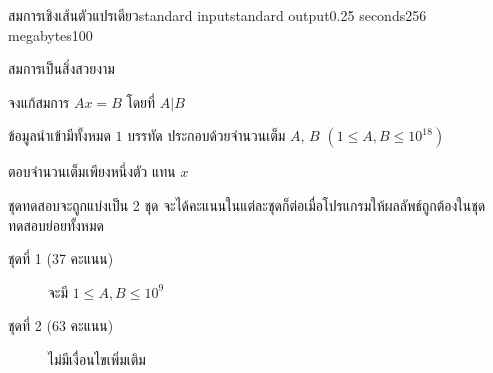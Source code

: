 \documentclass[11pt,a4paper]{article}
\begin{document}
\begin{problem}{สมการเชิงเส้นตัวแปรเดียว}{standard input}{standard output}{0.25 seconds}{256 megabytes}{100}

สมการเป็นสิ่งสวยงาม

จงแก้สมการ $Ax=B$ โดยที่ $A|B$

\InputFile
ข้อมูลนำเข้ามีทั้งหมด $1$ บรรทัด
ประกอบด้วยจำนวนเต็ม $A$, $B$ $(1 \leq A, B \leq 10^{18})$

\OutputFile
ตอบจำนวนเต็มเพียงหนึ่งตัว แทน $x$

\Scoring
ชุดทดสอบจะถูกแบ่งเป็น 2 ชุด จะได้คะแนนในแต่ละชุดก็ต่อเมื่อโปรแกรมให้ผลลัพธ์ถูกต้องในชุดทดสอบย่อยทั้งหมด

\begin{description}

\item[ชุดที่ 1 (37 คะแนน)] จะมี $ 1 \leq A, B \leq 10^9$

\item[ชุดที่ 2 (63 คะแนน)] ไม่มีเงื่อนไขเพิ่มเติม 

\end{description}

\Examples

\begin{example}
%
%
\end{example}

\end{problem}
\end{document}
